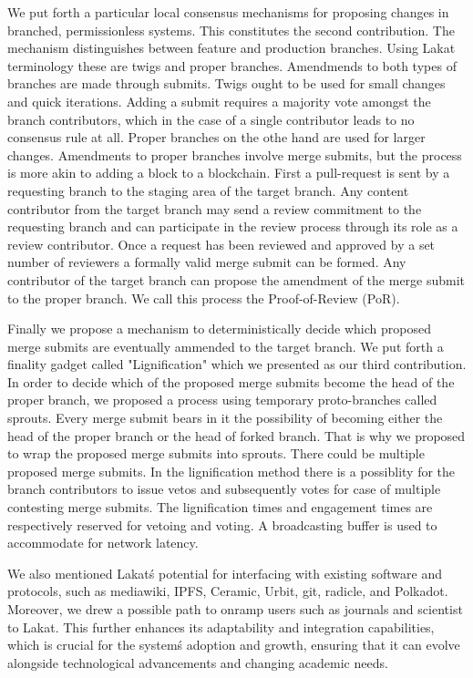 \documentclass[14pt]{article}
\begin{document}
We put forth a particular local consensus mechanisms for proposing changes in branched, permissionless systems. This constitutes the second contribution. The mechanism distinguishes between feature and production branches. Using Lakat terminology these are twigs and proper branches. Amendmends to both types of branches are made through submits. Twigs ought to be used for small changes and quick iterations. Adding a submit requires a majority vote amongst the branch contributors, which in the case of a single contributor leads to no consensus rule at all. Proper branches on the othe hand are used for larger changes. Amendments to proper branches involve merge submits, but the process is more akin to adding a block to a blockchain. First a pull-request is sent by a requesting branch to the staging area of the target branch. Any content contributor from the target branch may send a review commitment to the requesting branch and can participate in the review process through its role as a review contributor. Once a request has been reviewed and approved by a set number of reviewers a formally valid merge submit can be formed. Any contributor of the target branch can propose the amendment of the merge submit to the proper branch. We call this process the Proof-of-Review (PoR).

Finally we propose a mechanism to deterministically decide which proposed merge submits are eventually ammended to the target branch. We put forth a finality gadget called "Lignification" which we presented as our third contribution. In order to decide which of the proposed merge submits become the head of the proper branch, we proposed a process using temporary proto-branches called sprouts. Every merge submit bears in it the possibility of becoming either the head of the proper branch or the head of forked branch. That is why we proposed to wrap the proposed merge submits into sprouts. There could be multiple proposed merge submits. In the lignification method there is a possiblity for the branch contributors to issue vetos and subsequently votes for case of multiple contesting merge submits. The lignification times and engagement times are respectively reserved for vetoing and voting. A broadcasting buffer is used to accommodate for network latency. 

We also mentioned Lakat\'s potential for interfacing with existing software and protocols, such as mediawiki, IPFS, Ceramic, Urbit, git, radicle, and Polkadot. Moreover, we drew a possible path to onramp users such as journals and scientist to Lakat. This further enhances its adaptability and integration capabilities, which is crucial for the system\'s adoption and growth, ensuring that it can evolve alongside technological advancements and changing academic needs.
\end{document}
